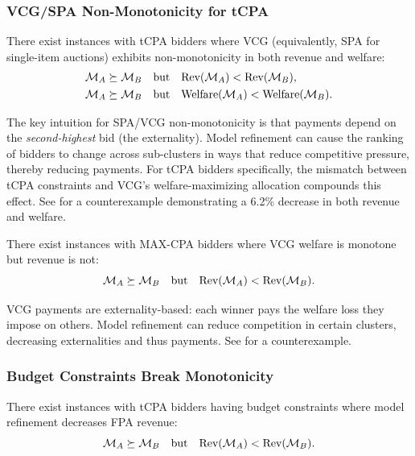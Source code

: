 \subsubsection{VCG/SPA Non-Monotonicity for tCPA}

\begin{theorem}
\label{thm:vcg-tcpa-nonmono}
There exist instances with tCPA bidders where VCG (equivalently, SPA for single-item auctions) exhibits non-monotonicity in both revenue and welfare:
\begin{align}
\mathcal{M}_A \succeq \mathcal{M}_B \quad \text{but} \quad &\text{Rev}(\mathcal{M}_A) < \text{Rev}(\mathcal{M}_B), \\
\mathcal{M}_A \succeq \mathcal{M}_B \quad \text{but} \quad &\text{Welfare}(\mathcal{M}_A) < \text{Welfare}(\mathcal{M}_B).
\end{align}
\end{theorem}

The key intuition for SPA/VCG non-monotonicity is that payments depend on the \emph{second-highest} bid (the externality). Model refinement can cause the ranking of bidders to change across sub-clusters in ways that reduce competitive pressure, thereby reducing payments. For tCPA bidders specifically, the mismatch between tCPA constraints and VCG's welfare-maximizing allocation compounds this effect. See  for a counterexample demonstrating a 6.2\% decrease in both revenue and welfare.

\begin{theorem}
\label{thm:vcg-maxcpa-revenue-nonmono}
There exist instances with MAX-CPA bidders where VCG welfare is monotone but revenue is not:
\begin{equation}
\mathcal{M}_A \succeq \mathcal{M}_B \quad \text{but} \quad \text{Rev}(\mathcal{M}_A) < \text{Rev}(\mathcal{M}_B).
\end{equation}
\end{theorem}

VCG payments are externality-based: each winner pays the welfare loss they impose on others. Model refinement can reduce competition in certain clusters, decreasing externalities and thus payments. See  for a counterexample.

\subsubsection{Budget Constraints Break Monotonicity}

\begin{theorem}
\label{thm:fpa-budget-nonmono}
There exist instances with tCPA bidders having budget constraints where model refinement decreases FPA revenue:
\begin{equation}
\mathcal{M}_A \succeq \mathcal{M}_B \quad \text{but} \quad \text{Rev}(\mathcal{M}_A) < \text{Rev}(\mathcal{M}_B).
\end{equation}
\end{theorem}

